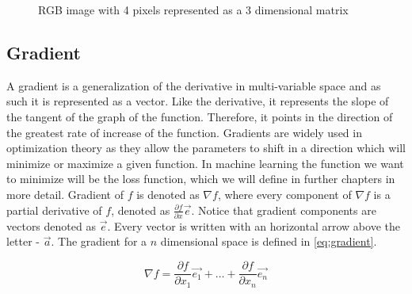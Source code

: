 \documentclass[times, utf8, diplomski]{fer}
\begin{document}
\begin{figure}
\centering
{}
\caption{RGB image with 4 pixels  represented as a 3 dimensional matrix}
\label{fig:image_matrix}
\end{figure}

\subsection{Gradient}
A gradient is a generalization of the derivative in multi-variable space and as such it is represented as a vector. Like the derivative, it represents the slope of the tangent of the graph of the function. Therefore, it points in the direction of the greatest rate of increase of the function. Gradients are widely used in optimization theory as they allow the parameters to shift in a direction which will minimize or maximize a given function. In machine learning the function we want to minimize will be the loss function, which we will define in further chapters in more detail. Gradient of $f$ is denoted as $\nabla{f}$, where every component of $\nabla{f}$ is a partial derivative of $f$, denoted as $\frac{\partial{f}}{\partial{x}}\vec{e}$. Notice that gradient components are vectors denoted as $\vec{e}$. Every vector is written with an horizontal arrow above the letter - $\vec{a}$. The gradient for a $n$ dimensional space is defined in \ref{eq:gradient}.

\begin{equation} \label{eq:gradient}
    \nabla{f}= \frac{\partial{f}}{\partial{x_{1}}}\vec{e_1} + \hdots + 	   \frac{\partial{f}}{\partial{x_{n}}}\vec{e_n}
\end{equation}
\end{document}
